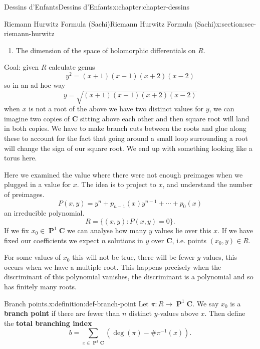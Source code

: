 \documentclass[oneside,10pt,]{book}
\newcommand{\terminology}[1]{\textbf{#1}}
\numberwithin{equation}{section}
\newcommand{\inv}{^{-1}}
\newcommand{\CC}{\mathbf{C}}
\DeclareMathOperator{\PP}{\mathbf{P}}
\begin{document}
\begin{chapterptx}{Dessins d'Enfants}{}{Dessins d'Enfants}{}{}{x:chapter:chapter-dessins}
\begin{sectionptx}{Riemann Hurwitz Formula (Sachi)}{}{Riemann Hurwitz Formula (Sachi)}{}{}{x:section:sec-riemann-hurwitz}
\begin{enumerate}
\begin{equation*}
\chi(R) = V -E + F = 2-2g
\end{equation*}
%
\item{}The dimension of the space of holomorphic differentials on \(R\).%
\end{enumerate}
%
\par
Goal: given \(R\) calculate genus%
\begin{equation*}
y^2 = (x+1)(x-1)(x+2)(x-2)
\end{equation*}
so in an ad hoc way%
\begin{equation*}
y = \sqrt{(x+1)(x-1)(x+2)(x-2)}
\end{equation*}
when \(x\) is not a root of the above we have two distinct values for \(y\), we can imagine two copies of \(\CC\) sitting above each other and then square root will land in both copies. We have to make branch cuts between the roots and glue along these to account for the fact that going around a small loop surrounding a root will change the sign of our square root. We end up with something looking like a torus here.%
\par
Here we examined the value where there were not enough preimages when we plugged in a value for \(x\). The idea is to project to \(x\), and understand the number of preimages.%
\begin{equation*}
P(x,y) = y^n + p_{n-1}(x) y^{n-1} + \cdots + p_0(x)
\end{equation*}
an  irreducible polynomial.%
\begin{equation*}
R= \{(x,y) : P(x,y) = 0\}\text{.}
\end{equation*}
If we fix \(x_0 \in \PP^1 \CC\) we can analyse how many \(y\) values lie over this \(x\). If we have fixed our coefficients we expect \(n\) solutions in \(y\) over \(\CC\), i.e. points \((x_0,y)\in R\).%
\par
For some values of \(x_0\) this will not be true, there will be fewer \(y\)-values, this occurs when we have a multiple root. This happens precisely when the discriminant of this polynomial vanishes, the discriminant is a polynomial and so has finitely many roots.%
\begin{definition}{Branch points.}{x:definition:def-branch-point}%
Let \(\pi\colon R \to \PP^1 \CC\). We say \(x_0\) is a \terminology{branch point} if there are fewer than \(n\) distinct \(y\)-values above \(x\). Then define the \terminology{total branching index}%
\begin{equation*}
b = \sum_{x\in \PP^1 \CC} (\deg(\pi) - \# \pi\inv (x))\text{.}

\end{equation*}
\end{definition}
\end{sectionptx}
\end{chapterptx}
\end{document}
